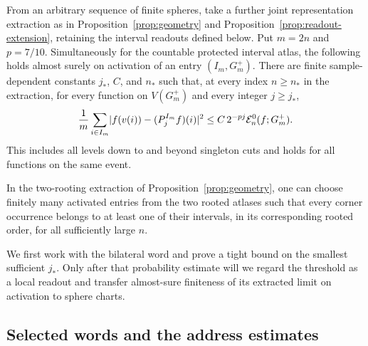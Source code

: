 \begin{theorem}
\label{thm:block-approximation}
From an arbitrary sequence of finite spheres, take a further joint
representation extraction as in Proposition~\ref{prop:geometry}
and Proposition~\ref{prop:readout-extension}, retaining the interval
readouts defined below.  Put \(m=2n\) and
\(p=7/10\).  Simultaneously for the countable protected interval
atlas, the following holds almost surely on activation of an entry
\((I_m,G_m^+)\).  There are finite sample-dependent constants
\(j_*\), \(C\), and \(n_*\) such that, at every index \(n\ge n_*\)
in the extraction, for every function on \(V(G_m^+)\) and every
integer \(j\ge j_*\),
\begin{equation}
\label{eq:block-approximation}
 \frac1m\sum_{i\in I_m}
   \lvert f(v(i))-(P_j^{I_m}f)(i)\rvert^2
 \le C\,2^{-pj} \mathcal E_n^0(f;G_m^+).
\end{equation}
This includes all levels down to and beyond singleton cuts and holds
for all functions on the same event.

In the two-rooting extraction of Proposition~\ref{prop:geometry},
one can choose finitely many activated entries from the two rooted
atlases such that every corner occurrence belongs to at least one
of their intervals, in its corresponding rooted order, for all
sufficiently large \(n\).
\end{theorem}

We first work with the bilateral word and prove a tight bound on the
smallest sufficient \(j_*\).  Only after that probability estimate
will we regard the threshold as a local readout and transfer
almost-sure finiteness of its extracted limit on activation to sphere charts.

\subsection{Selected words and the address estimates}

